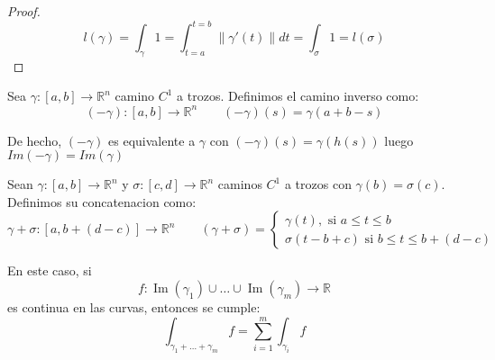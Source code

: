 \begin{proof}
    $$l(\gamma) =\int_{\gamma}1=\int_{t=a}^{t=b} \lVert \gamma'(t) \rVert dt=\int_{\sigma}1=l(\sigma)$$
\end{proof}

\begin{definición} 
Sea $\gamma:[a,b] \to \mathbb{R}^n$ camino $C^1$ a trozos. Definimos el camino inverso como:
$$(-\gamma):[a,b] \to \mathbb{R}^n \qquad (-\gamma)(s)=\gamma(a+b-s)$$
\end{definición}

\begin{observación}
De hecho, $(-\gamma)$ es equivalente a $\gamma$ con $(-\gamma)(s)=\gamma(h(s))$ luego $Im(-\gamma)=Im(\gamma)$
\end{observación}

\begin{definición}
Sean $\gamma:[a,b] \to \mathbb{R}^n$ y $\sigma:[c,d] \to \mathbb{R}^n$ caminos $C^1$ a trozos con $\gamma(b)=\sigma(c)$. Definimos su concatenacion como:\\
$$\gamma + \sigma:[a,b+(d-c)] \to \mathbb{R}^n \qquad (\gamma + \sigma) = \begin{cases}
        \gamma(t), \text{ si } a \leq t \leq b \\
        \sigma(t - b + c) \text{ si } b\leq t \leq b+(d-c)
    \end{cases}$$
\end{definición}

\begin{observación}
En este caso, si
\[
    f : \operatorname{Im}(\gamma_1) \cup \dots \cup \operatorname{Im}(\gamma_m) \longrightarrow \mathbb{R}
\]
es continua en las curvas, entonces se cumple:
\[
    \int_{\gamma_1 + \dots + \gamma_m} f = \sum_{i=1}^{m} \int_{\gamma_i} f
\]
\end{observación}


